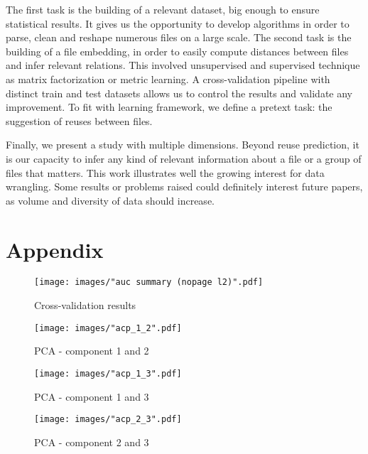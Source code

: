 \documentclass[a4paper]{article}
\begin{document}
	The first task is the building of a relevant dataset, big enough to ensure statistical results. It gives us the opportunity to develop algorithms in order to parse, clean and reshape numerous files on a large scale. The second task is the building of a file embedding, in order to easily compute distances between files and infer relevant relations. This involved unsupervised and supervised technique as matrix factorization or metric learning. A cross-validation pipeline with distinct train and test datasets allows us to control the results and validate any improvement. To fit with learning framework, we define a pretext task: the suggestion of reuses between files. 
	
	Finally, we present a study with multiple dimensions. Beyond reuse prediction, it is our capacity to infer any kind of relevant information about a file or a group of files that matters. This work illustrates well the growing interest for data wrangling. Some results or problems raised could definitely interest future papers, as volume and diversity of data should increase. 
	
	
	
	
	\section{Appendix}
	
	\begin{figure}[h]
		\centering
		\texttt{[image: images/"auc summary (nopage l2)".pdf]}
		\caption{Cross-validation results}
		\label{fig:auc summary}
	\end{figure}

	\begin{figure}[h]
		\centering
		\texttt{[image: images/"acp\_1\_2".pdf]}
		\caption{PCA - component 1 and 2}
		\label{fig:pca12}
	\end{figure}
	
	\begin{figure}[h]
		\centering
		\texttt{[image: images/"acp\_1\_3".pdf]}
		\caption{PCA - component 1 and 3}
		\label{fig:pca13}
	\end{figure}
	
	\begin{figure}[h]
		\centering
		\texttt{[image: images/"acp\_2\_3".pdf]}
		\caption{PCA - component 2 and 3}
		\label{fig:pca23}
	\end{figure}
	
\end{document}
